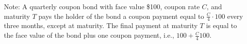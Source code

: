 \begin{exercises}
\noindent Note: A quarterly coupon bond with face value \$100, coupon rate $C$, and
maturity $T$ pays the holder of the bond a coupon payment equal to $\frac{C}{4} \cdot
100$ every three months, except at maturity. The final payment at maturity $T$ is equal
to the face value of the bond plus one coupon payment, i.e., $100 + \frac{C}{4}100$.

\end{exercises}

